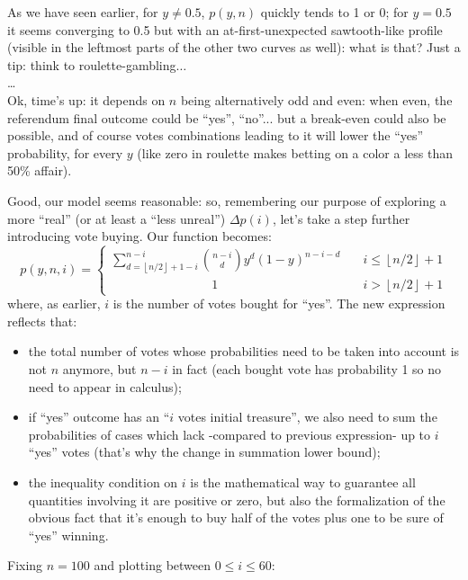 \documentclass[10pt,a4paper]{article}
\begin{document}
	As we have seen earlier, for $y \neq 0.5$, $p(y,n)$ quickly tends to 1 or 0; for $y = 0.5$ it seems converging to 0.5 but with an at-first-unexpected sawtooth-like profile (visible in the leftmost parts of the other two curves as well): what is that? Just a tip: think to roulette-gambling$\dots$\\
	\dots\\
	Ok, time’s up: it depends on $n$ being alternatively odd and even: when even, the referendum final outcome could be \enquote{yes}, \enquote{no}... but a break-even could also be possible, and of course votes combinations leading to it will lower the \enquote{yes} probability, for every $y$ (like zero in roulette makes betting on a color a less than 50\% affair).
	
	Good, our model seems reasonable: so, remembering our purpose of exploring a more \enquote{real} (or at least a \enquote{less unreal}) $\Delta p(i)$, let’s take a step further introducing vote buying. Our function becomes:
	\begin{equation*}
		p(y,n,i)=
		\begin{cases} 
			\displaystyle
			\sum_{d=\left \lfloor n/2 \right \rfloor +1-i}^{n-i} \binom{n-i}{d} y^{d} (1-y)^{n-i-d} & \quad i \leq \left \lfloor n/2 \right \rfloor +1\\
			\qquad \qquad \qquad \qquad 1 & \quad i > \left \lfloor n/2 \right \rfloor +1
		\end{cases}
	\end{equation*}
	where, as earlier, $i$ is the number of votes bought for \enquote{yes}. The new expression reflects that:
	\begin{itemize}
		\item the total number of votes whose probabilities need to be taken into account is not $n$ anymore, but $n-i$ in fact (each bought vote has probability 1 so no need to appear in calculus);
		\item if \enquote{yes} outcome has an \enquote{$i$ votes initial treasure}, we also need to sum the probabilities of cases which lack -compared to previous expression- up to $i$ \enquote{yes} votes (that’s why the change in summation lower bound);
		\item the inequality condition on $i$ is the mathematical way to guarantee all quantities involving it are positive or zero, but also the formalization of the obvious fact that it’s enough to buy half of the votes plus one to be sure of \enquote{yes} winning.
	\end{itemize}
	Fixing $n=100$ and plotting between $0 \leq i \leq 60$:
\end{document}

